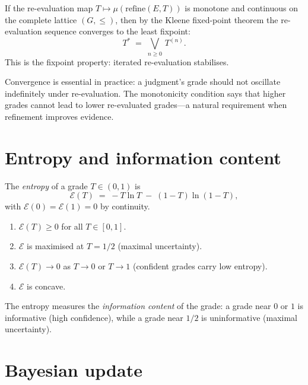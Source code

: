 \begin{theorem}
\label{thm:fixpoint}
If the re-evaluation map $T \mapsto \mu(\mathrm{refine}(E, T))$ is
monotone and continuous on the complete lattice $(G, \leq)$, then by
the Kleene fixed-point theorem the re-evaluation sequence converges
to the least fixpoint:
\[
  T^* \;=\; \bigvee_{n \geq 0}\, T^{(n)}.
\]
This is the \FMLM{} fixpoint property: iterated re-evaluation
stabilises.
\end{theorem}

\begin{remark}
Convergence is essential in practice: a judgment's grade should not
oscillate indefinitely under re-evaluation.  The monotonicity
condition says that higher grades cannot lead to lower re-evaluated
grades---a natural requirement when refinement improves evidence.
\end{remark}

\section{Entropy and information content}
\label{sec:entropy}

\begin{definition}
\label{def:entropy}
The \emph{entropy} of a grade $T \in (0,1)$ is
\[
  \mathcal{E}(T) \;=\;
  -T \ln T \;-\; (1-T) \ln(1-T),
\]
with $\mathcal{E}(0) = \mathcal{E}(1) = 0$ by continuity.
\end{definition}

\begin{proposition}
\label{prop:entropy}
\hfill
\begin{enumerate}[label=(\alph*),nosep]
\item $\mathcal{E}(T) \geq 0$ for all $T \in [0,1]$.
\item $\mathcal{E}$ is maximised at $T = 1/2$ (maximal uncertainty).
\item $\mathcal{E}(T) \to 0$ as $T \to 0$ or $T \to 1$ (confident
  grades carry low entropy).
\item $\mathcal{E}$ is concave.
\end{enumerate}
The entropy measures the \emph{information content} of the grade: a
grade near $0$ or $1$ is informative (high confidence), while a grade
near $1/2$ is uninformative (maximal uncertainty).
\end{proposition}

\section{Bayesian update}
\label{sec:bayesian}

